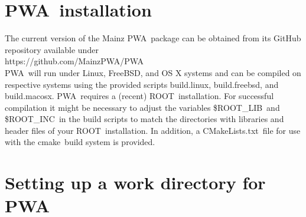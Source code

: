 \documentclass[a4paper,10pt]{article}
\def\PWA{\ttfamily PWA\rmfamily\ }
\def\tt{\ttfamily}
\def\rm{\rmfamily}
\begin{document}
\section{\PWA installation}

The current version of the Mainz \PWA package can be obtained from its GitHub repository available under\\
\tt https://github.com/MainzPWA/PWA\rm \\
\PWA will run under Linux, FreeBSD, and OS X systems and can be compiled on respective systems using the provided
scripts \tt build.linux\rm, \tt build.freebsd\rm, and \tt build.macosx\rm. \PWA requires a (recent) \tt ROOT\rm\ installation.
For successful compilation it might be necessary to adjust the variables \tt \$ROOT\_LIB\rm\ and \tt \$ROOT\_INC\rm\
in the build scripts to match the directories with libraries and header files of your \tt ROOT\rm\ installation.
In addition, a \tt CMakeLists.txt\rm\ file for use with the \tt cmake\rm\ build system is provided.

\section{Setting up a work directory for \PWA}
\end{document}
